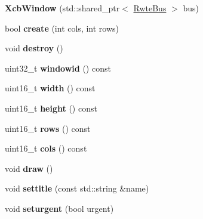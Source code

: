 \begin{DoxyCompactItemize}
\item 
\mbox{\label{classXcbWindow_a35a00d7ef50bb11ac195d77231ec79c1}} 
{\bfseries Xcb\+Window} (std\+::shared\+\_\+ptr$<$ \mbox{\hyperlink{classBus}{Rwte\+Bus}} $>$ bus)
\item 
\mbox{\label{classXcbWindow_a9e2fb2998256ce0803a402a0ac60cbde}} 
bool {\bfseries create} (int cols, int rows)
\item 
\mbox{\label{classXcbWindow_a5f77274623466ae076ca512fa46904ef}} 
void {\bfseries destroy} ()
\item 
\mbox{\label{classXcbWindow_a443950847628fc8c3d96c5cf87198ebc}} 
uint32\+\_\+t {\bfseries windowid} () const
\item 
\mbox{\label{classXcbWindow_a1453e9ebe57b07f006ee24044ceb7a59}} 
uint16\+\_\+t {\bfseries width} () const
\item 
\mbox{\label{classXcbWindow_a5727e413f0ea48eaa9268a8af403d97f}} 
uint16\+\_\+t {\bfseries height} () const
\item 
\mbox{\label{classXcbWindow_a25f33ac16786582c5893172ad839ec4d}} 
uint16\+\_\+t {\bfseries rows} () const
\item 
\mbox{\label{classXcbWindow_a5f741ffa5bcefc67fca4b04894692c50}} 
uint16\+\_\+t {\bfseries cols} () const
\item 
\mbox{\label{classXcbWindow_a86c4ce381470cb161a3341064f0b96b6}} 
void {\bfseries draw} ()
\item 
\mbox{\label{classXcbWindow_a6f6c38b0480836efa2f504eef2beafc6}} 
void {\bfseries settitle} (const std\+::string \&name)
\item 
\mbox{\label{classXcbWindow_a0e55c31bc2de7741542923412b8b923d}} 
void {\bfseries seturgent} (bool urgent)
\item 
\mbox{\label{classXcbWindow_ab5e0d137822dd5219faa7b7ac4879cac}} 

\end{DoxyCompactItemize}
